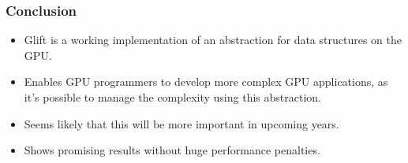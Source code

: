 \documentclass[xcolor={usenames,dvipsnames}]{beamer}
\begin{document}
\begin{frame}
  \frametitle{Conclusion}

  \begin{itemize}
  \item<+-> Glift is a working implementation of an abstraction for data
    structures on the GPU.
  \item<+-> Enables GPU programmers to develop more complex GPU applications, as
    it's possible to manage the complexity using this abstraction.
  \item<+-> Seems likely that this will be more important in upcoming years.
  \item<+-> Shows promising results without huge performance penalties.
  \end{itemize}
\end{frame}
\end{document}
